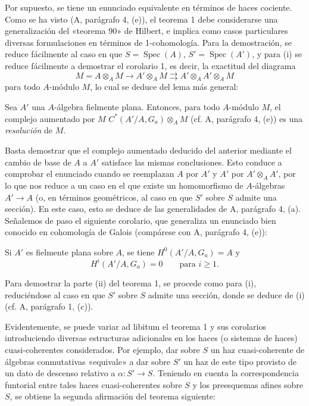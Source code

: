 Por supuesto, se tiene un enunciado equivalente en términos de haces
cociente. Como se ha visto (A, parágrafo 4, (e)), el teorema 1 debe considerarse
una generalización del «teorema 90» de Hilbert, e implica como casos
particulares diversas formulaciones en términos de 1-cohomología. Para la
demostración, se reduce fácilmente al caso en que $S=\operatorname{Spec}(A)$,
$S'=\operatorname{Spec}(A')$, y para (i) se reduce fácilmente a demostrar el
corolario 1, es decir, la exactitud del diagrama
\[
  M=A\otimes_A M\longrightarrow A'\otimes_A M
  \rightrightarrows A'\otimes_AA'\otimes_A M
\]
para todo $A$-módulo $M$, lo cual se deduce del lema más general:

 Sea $A'$ una $A$-álgebra fielmente plana. Entonces, para
todo $A$-módulo $M$, el complejo aumentado por $M$
$C^*(A'/A,G_a)\otimes_A M$ (cf. A, parágrafo 4, (e)) es una
\emph{resolución} de $M$.

Basta demostrar que el complejo aumentado deducido del anterior mediante el
cambio de base de $A$ a $A'$ satisface las mismas conclusiones. Esto conduce a
comprobar el enunciado cuando se reemplazan $A$ por $A'$ y $A'$ por
$A'\otimes_AA'$, por lo que nos reduce a un caso en el que existe un
homomorfismo de $A$-álgebras $A'\longrightarrow A$ (o, en términos
geométricos, al caso en que $S'$ sobre $S$ admite una sección). En este caso,
esto se deduce de las generalidades de A, parágrafo 4, (a). Señalemos de paso
el siguiente corolario, que generaliza un enunciado bien conocido en
cohomología de Galois (compárese con A, parágrafo 4, (e)):

 Si $A'$ es fielmente plana sobre $A$, se tiene
$H^0(A'/A,G_a)=A$ y
\[
  H^i(A'/A,G_a)=0\qquad\text{para $i\geq1$}.
\]

Para demostrar la parte (ii) del teorema 1, se procede como para (i),
reduciéndose al caso en que $S'$ sobre $S$ admite una sección, donde se deduce
de (i) (cf. A, parágrafo 1, (c)).

Evidentemente, se puede variar ad libitum el teorema 1 y sus corolarios
introduciendo diversas estructuras adicionales en los haces (o sistemas de
haces) cuasi-coherentes considerados. Por ejemplo, dar sobre $S$ un haz
cuasi-coherente de álgebras conmutativas «equivale» a dar sobre $S'$ un haz de
este tipo provisto de un dato de descenso relativo a
$\alpha:S'\longrightarrow S$. Teniendo en cuenta la correspondencia funtorial
entre tales haces cuasi-coherentes sobre $S$ y los preesquemas afines sobre
$S$, se obtiene la segunda afirmación del teorema siguiente:

